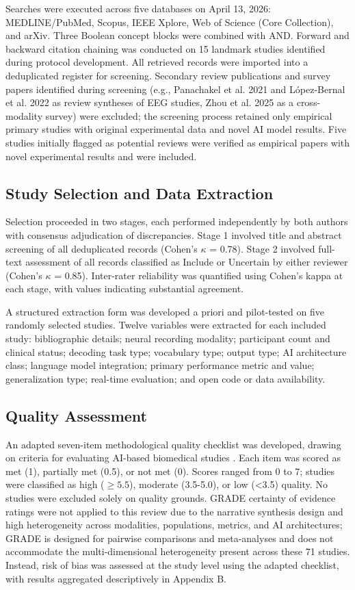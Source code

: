 \documentclass[11pt,a4paper]{article}
\begin{document}
Searches were executed across five databases on April 13, 2026: MEDLINE/PubMed, Scopus, IEEE Xplore, Web of Science (Core Collection), and arXiv. Three Boolean concept blocks were combined with AND. Forward and backward citation chaining was conducted on 15 landmark studies identified during protocol development. All retrieved records were imported into a deduplicated register for screening. Secondary review publications and survey papers identified during screening (e.g., Panachakel et al. 2021 and López-Bernal et al. 2022 as review syntheses of EEG studies, Zhou et al. 2025 as a cross-modality survey) were excluded; the screening process retained only empirical primary studies with original experimental data and novel AI model results. Five studies initially flagged as potential reviews were verified as empirical papers with novel experimental results and were included.

\subsection{Study Selection and Data Extraction}

Selection proceeded in two stages, each performed independently by both authors with consensus adjudication of discrepancies. Stage 1 involved title and abstract screening of all deduplicated records (Cohen's $\kappa$ = 0.78). Stage 2 involved full-text assessment of all records classified as Include or Uncertain by either reviewer (Cohen's $\kappa$ = 0.85). Inter-rater reliability was quantified using Cohen's kappa \cite{Cohen1960} at each stage, with values indicating substantial agreement.

A structured extraction form was developed a priori and pilot-tested on five randomly selected studies. Twelve variables were extracted for each included study: bibliographic details; neural recording modality; participant count and clinical status; decoding task type; vocabulary type; output type; AI architecture class; language model integration; primary performance metric and value; generalization type; real-time evaluation; and open code or data availability.

\subsection{Quality Assessment}

An adapted seven-item methodological quality checklist was developed, drawing on criteria for evaluating AI-based biomedical studies \cite{Sterne2019}. Each item was scored as met (1), partially met (0.5), or not met (0). Scores ranged from 0 to 7; studies were classified as high ($\geq 5.5$), moderate (3.5-5.0), or low (<3.5) quality. No studies were excluded solely on quality grounds. GRADE certainty of evidence ratings were not applied to this review due to the narrative synthesis design and high heterogeneity across modalities, populations, metrics, and AI architectures; GRADE is designed for pairwise comparisons and meta-analyses and does not accommodate the multi-dimensional heterogeneity present across these 71 studies. Instead, risk of bias was assessed at the study level using the adapted checklist, with results aggregated descriptively in Appendix B.
\end{document}
